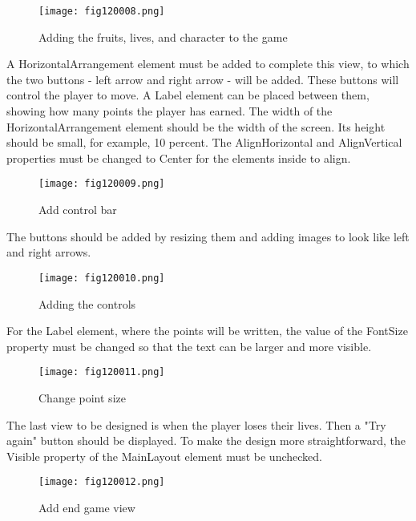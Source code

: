 \begin{figure}[H]
   \centering
   \texttt{[image: fig120008.png]}
   \caption{Adding the fruits, lives, and character to the game}
\label{fig120008}
\end{figure}

A HorizontalArrangement element must be added to complete this view, to which the two buttons - left arrow and right arrow - will be added. These buttons will control the player to move. A Label element can be placed between them, showing how many points the player has earned.
The width of the HorizontalArrangement element should be the width of the screen. Its height should be small, for example, 10 percent. The AlignHorizontal and AlignVertical properties must be changed to Center for the elements inside to align.

\begin{figure}[H]
   \centering
   \texttt{[image: fig120009.png]}
   \caption{Add control bar}
\label{fig120009}
\end{figure}

The buttons should be added by resizing them and adding images to look like left and right arrows.

\begin{figure}[H]
   \centering
   \texttt{[image: fig120010.png]}
   \caption{Adding the controls}
\label{fig120010}
\end{figure}

For the Label element, where the points will be written, the value of the FontSize property must be changed so that the text can be larger and more visible.

\begin{figure}[H]
   \centering
   \texttt{[image: fig120011.png]}
   \caption{Change point size}
\label{fig120011}
\end{figure}

The last view to be designed is when the player loses their lives. Then a "Try again" button should be displayed. To make the design more straightforward, the Visible property of the MainLayout element must be unchecked.

\begin{figure}[H]
   \centering
   \texttt{[image: fig120012.png]}
   \caption{Add end game view}
\label{fig120012}
\end{figure}

